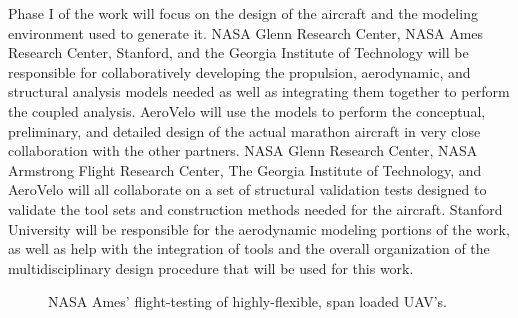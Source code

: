 \documentclass[]{aiaa-tc}
\begin{document}
    Phase I of the work will focus on the design of the aircraft and the modeling environment used 
    to generate it. NASA Glenn Research Center, NASA Ames Research Center, Stanford, and 
    the Georgia Institute of Technology will be responsible for collaboratively developing the 
    propulsion, aerodynamic, and structural analysis models needed as well as integrating 
    them together to perform the coupled analysis. AeroVelo will
    use the models to perform the conceptual, preliminary, and detailed design of the actual marathon 
    aircraft in very close collaboration with the other partners. NASA Glenn Research Center, NASA Armstrong Flight Research Center, 
    The Georgia Institute of Technology, and AeroVelo will all collaborate on a set of structural validation 
    tests designed to validate the tool sets and construction methods needed for the aircraft.  Stanford 
    University will be responsible for the aerodynamic modeling portions of the work, as well as 
    help with the integration of tools and the overall organization of the multidisciplinary design 
    procedure that will be used for this work.


    \begin{figure}[!hbt]
        \centering
            

            
            \caption{NASA Ames’ flight-testing of highly-flexible, span loaded UAV's.}
            \label{fig:AmesUAV}
            
    \end{figure}
\end{document}
